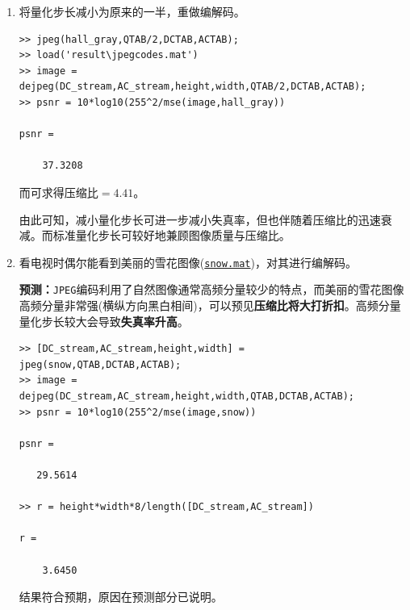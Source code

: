 \documentclass{article}
\numberwithin{figure}{section}
\numberwithin{table}{section}
\numberwithin{listing}{section}
\numberwithin{equation}{section}
\begin{document}
\begin{enumerate}
\begin{enumerate}
                \end{enumerate}

            \item 将量化步长减小为原来的一半，重做编解码。

                \begin{verbatim}
>> jpeg(hall_gray,QTAB/2,DCTAB,ACTAB);
>> load('result\jpegcodes.mat')
>> image = dejpeg(DC_stream,AC_stream,height,width,QTAB/2,DCTAB,ACTAB);
>> psnr = 10*log10(255^2/mse(image,hall_gray))

psnr =

    37.3208
                \end{verbatim}

                而可求得压缩比$=4.41$。

                由此可知，减小量化步长可进一步减小失真率，但也伴随着压缩比的迅速衰减。而标准量化步长可较好地兼顾图像质量与压缩比。

            \item 看电视时偶尔能看到美丽的雪花图像(\href{../resource/snow.mat}{\texttt{snow.mat}})，对其进行编解码。

                \textbf{预测：}\texttt{JPEG}编码利用了自然图像通常高频分量较少的特点，而美丽的雪花图像高频分量非常强(横纵方向黑白相间)，可以预见\textbf{压缩比将大打折扣}。高频分量量化步长较大会导致\textbf{失真率升高}。

                \begin{verbatim}
>> [DC_stream,AC_stream,height,width] = jpeg(snow,QTAB,DCTAB,ACTAB);
>> image = dejpeg(DC_stream,AC_stream,height,width,QTAB,DCTAB,ACTAB);
>> psnr = 10*log10(255^2/mse(image,snow))

psnr =

   29.5614

>> r = height*width*8/length([DC_stream,AC_stream])

r =

    3.6450
                \end{verbatim}

                结果符合预期，原因在预测部分已说明。


\end{enumerate}
\end{document}
